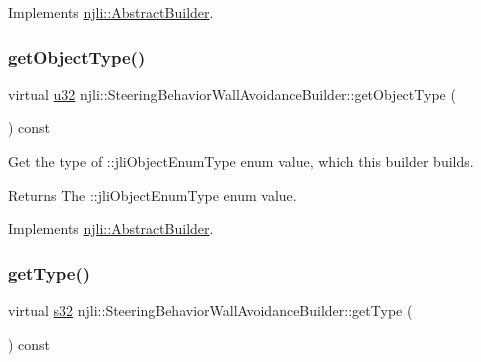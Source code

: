 Implements \mbox{\hyperlink{classnjli_1_1_abstract_builder_a902f73ea78031b06aca183a417f3413b}{njli\+::\+Abstract\+Builder}}.

\mbox{\label{classnjli_1_1_steering_behavior_wall_avoidance_builder_a5156840678be5d63230262338d8bf755}} 
\subsubsection{\texorpdfstring{get\+Object\+Type()}{getObjectType()}}
{\footnotesize\ttfamily virtual \mbox{\hyperlink{_util_8h_a10e94b422ef0c20dcdec20d31a1f5049}{u32}} njli\+::\+Steering\+Behavior\+Wall\+Avoidance\+Builder\+::get\+Object\+Type (\begin{DoxyParamCaption}{ }\end{DoxyParamCaption}) const\hspace{0.3cm}{\ttfamily [virtual]}}

Get the type of \+::jli\+Object\+Enum\+Type enum value, which this builder builds.

\begin{DoxyReturn}{Returns}
The \+::jli\+Object\+Enum\+Type enum value. 
\end{DoxyReturn}


Implements \mbox{\hyperlink{classnjli_1_1_abstract_builder_a0f2d344fcf697b167f4f2b1122b5fb33}{njli\+::\+Abstract\+Builder}}.

\mbox{\label{classnjli_1_1_steering_behavior_wall_avoidance_builder_a3e69a1c879c2bb98778cbb779a9ee4e6}} 
\subsubsection{\texorpdfstring{get\+Type()}{getType()}}
{\footnotesize\ttfamily virtual \mbox{\hyperlink{_util_8h_aa62c75d314a0d1f37f79c4b73b2292e2}{s32}} njli\+::\+Steering\+Behavior\+Wall\+Avoidance\+Builder\+::get\+Type (\begin{DoxyParamCaption}{ }\end{DoxyParamCaption}) const\hspace{0.3cm}{\ttfamily [virtual]}}

